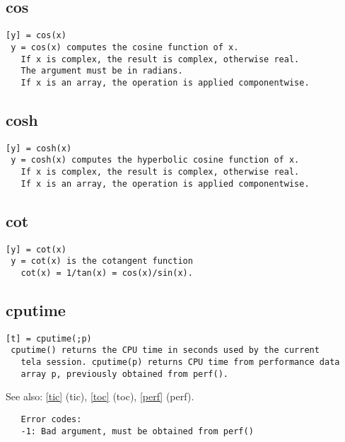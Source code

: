 \documentclass[a4paper]{article}
\begin{document}
\subsection{cos\label{cos}}

\begin{tscreen}
\begin{verbatim}
[y] = cos(x)
 y = cos(x) computes the cosine function of x.
   If x is complex, the result is complex, otherwise real.
   The argument must be in radians.
   If x is an array, the operation is applied componentwise.
\end{verbatim}
\end{tscreen}



\subsection{cosh\label{cosh}}

\begin{tscreen}
\begin{verbatim}
[y] = cosh(x)
 y = cosh(x) computes the hyperbolic cosine function of x.
   If x is complex, the result is complex, otherwise real.
   If x is an array, the operation is applied componentwise.
\end{verbatim}
\end{tscreen}



\subsection{cot\label{cot}}

\begin{tscreen}
\begin{verbatim}
[y] = cot(x)
 y = cot(x) is the cotangent function
   cot(x) = 1/tan(x) = cos(x)/sin(x). 
\end{verbatim}
\end{tscreen}



\subsection{cputime\label{cputime}}

\begin{tscreen}
\begin{verbatim}
[t] = cputime(;p)
 cputime() returns the CPU time in seconds used by the current
   tela session. cputime(p) returns CPU time from performance data
   array p, previously obtained from perf().
\end{verbatim}

See also: \ref{tic} {(tic)}, \ref{toc} {(toc)}, \ref{perf} {(perf)}.
\begin{verbatim}
   Error codes:
   -1: Bad argument, must be obtained from perf() 
\end{verbatim}
\end{tscreen}
\end{document}
